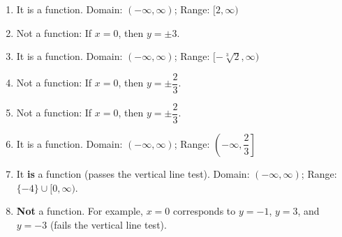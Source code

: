 \documentclass{ximera}
\begin{document}
\begin{problem}
\begin{solution}
\begin{enumerate}
  \item[(a)] It is a function. Domain: $(-\infty,\infty)$; Range: $[2,\infty)$

  \item[(b)] Not a function: If $x=0$, then $y = \pm 3$.

  \item[(c)] It is a function. Domain: $(-\infty,\infty)$; Range: $[-\sqrt[3]{2},\infty)$

  \item[(d)] Not a function: If $x=0$, then $y = \pm\dfrac{2}{3}$.

  \item[(e)] Not a function: If $x=0$, then $y = \pm\dfrac{2}{3}$.

  \item[(f)] It is a function. Domain: $(-\infty,\infty)$; Range: $\left(-\infty,\dfrac{2}{3}\right]$

  \item[(g)] It \textbf{is} a function (passes the vertical line test). Domain: $(-\infty,\infty)$; Range: $\{-4\}\cup[0,\infty)$.

  \item[(h)] \textbf{Not} a function. For example, $x=0$ corresponds to $y=-1$, $y=3$, and $y=-3$ (fails the vertical line test).
\end{enumerate}
\end{solution}
\end{problem}
\end{document}
